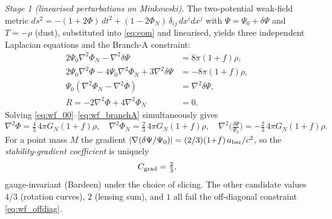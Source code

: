 \documentclass[aps,prd,twocolumn,nofootinbib,floatfix,superscriptaddress]{revtex4-2}
\begin{document}
\emph{Stage 1 (linearised perturbations on Minkowski).} The
two-potential weak-field metric
$ds^2 = -(1+2\Phi)\,dt^2 + (1-2\Phi_N)\,\delta_{ij}\,dx^i dx^j$ with
$\Psi = \Psi_0 + \delta\Psi$ and $T = -\rho$ (dust), substituted into
\eqref{eq:eom} and linearised, yields three independent Laplacian
equations and the Branch-A constraint:
\begin{align}
\label{eq:wf_00}
2\Psi_0\nabla^2\Phi_N - \nabla^2\delta\Psi &= 8\pi(1+f)\rho, \\
\label{eq:wf_trace}
2\Psi_0\nabla^2\Phi - 4\Psi_0\nabla^2\Phi_N + 3\nabla^2\delta\Psi
   &= -8\pi(1+f)\rho, \\
\label{eq:wf_offdiag}
\Psi_0(\nabla^2\Phi_N - \nabla^2\Phi) &= \nabla^2\delta\Psi, \\
\label{eq:wf_branchA}
R = -2\nabla^2\Phi + 4\nabla^2\Phi_N &= 0.
\end{align}
Solving \eqref{eq:wf_00}--\eqref{eq:wf_branchA} simultaneously gives
\begin{equation}
\nabla^2\Phi = \tfrac{4}{3}\,4\pi G_N(1{+}f)\rho,\quad
\nabla^2\Phi_N = \tfrac{2}{3}\,4\pi G_N(1{+}f)\rho,\quad
\nabla^2\!\bigl(\tfrac{\delta\Psi}{\Psi_0}\bigr) =
   -\tfrac{2}{3}\,4\pi G_N(1{+}f)\rho.
\end{equation}
For a point mass $M$ the gradient
$|\nabla(\delta\Psi/\Psi_0)| = (2/3)(1{+}f)\,a_{\rm bar}/c^2$, so the
\emph{stability-gradient coefficient} is uniquely
\begin{equation}
\label{eq:Cgrad}
C_{\rm grad} = \tfrac{2}{3},
\end{equation}
gauge-invariant (Bardeen) under the choice of slicing. The other
candidate values $4/3$ (rotation curves), $2$ (lensing sum), and $1$
all fail the off-diagonal constraint \eqref{eq:wf_offdiag}.
\end{document}
